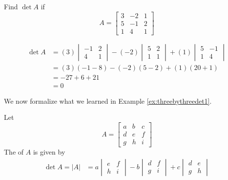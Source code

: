 \documentclass{ximera}
\begin{document}
\begin{example}\label{ex:threebythreedet1}
Find $\det{A}$ if 
$$A=\begin{bmatrix}3&-2&1\\5&-1&2\\1&4&1\end{bmatrix}$$
\begin{explanation}
\begin{align*}
\det{A}&=(3)\begin{vmatrix}-1&2\\4&1\end{vmatrix}-(-2)\begin{vmatrix}5&2\\1&1\end{vmatrix}+(1)\begin{vmatrix}5&-1\\1&4\end{vmatrix}\\
&=(3)(-1-8)-(-2)(5-2)+(1)(20+1)\\
&=-27+6+21\\
&=0
\end{align*}

\end{explanation}
\end{example}

We now formalize what we learned in Example \ref{ex:threebythreedet1}.
\begin{definition}\label{def:threebythreedet}
Let
$$A=\begin{bmatrix}a&b&c\\d&e&f\\g&h&i\end{bmatrix}$$
The  of $A$ is given by
\begin{align}\label{eq:det3by3}
\det{A}=|A|&=a\begin{vmatrix}e&f\\h&i\end{vmatrix}-b\begin{vmatrix}d&f\\g&i\end{vmatrix}+c\begin{vmatrix}d&e\\g&h\end{vmatrix}
\end{align}
\end{definition}
\end{document}
